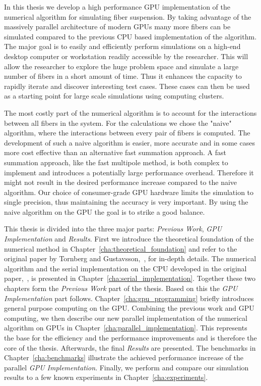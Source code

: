 In this thesis we develop a high performance GPU implementation of the numerical algorithm for simulating fiber suspension. By taking advantage of the massively parallel architecture of modern GPUs many more fibers can be simulated compared to the previous CPU based implementation of the algorithm. The major goal is to easily and efficiently perform simulations on a high-end desktop computer or workstation readily accessible by the researcher. This will allow the researcher to explore the huge problem space and simulate a large number of fibers in a short amount of time. Thus it enhances the capacity to rapidly iterate and discover interesting test cases. These cases can then be used as a starting point for large scale simulations using computing clusters.

The most costly part of the numerical algorithm is to account for the interactions between all fibers in the system. For the calculations we chose the "naive" algorithm, where the interactions between every pair of fibers is computed. The development of such a naive algorithm is easier, more accurate and in some cases more cost effective than an alternative fast summation approach. A fast summation approach, like the fast multipole method, is both complex to implement and introduces a potentially large performance overhead. Therefore it might not result in the desired performance increase compared to the naive algorithm. Our choice of consumer-grade GPU hardware limits the simulation to single precision, thus maintaining the accuracy is very important. By using the naive algorithm on the GPU the goal is to strike a good balance.

This thesis is divided into the three major parts: \emph{Previous Work}, \emph{GPU Implementation} and \emph{Results}. First we introduce the theoretical foundation of the numerical method in Chapter~\ref{cha:theoretical_foundation} and refer to the original paper by Tornberg and Gustavsson,~\cite{Tornberg2006}, for in-depth details. The numerical algorithm and the serial implementation on the CPU developed in the original paper,~\cite{Tornberg2006}, is presented in Chapter~\ref{cha:serial_implementation}. Together these two chapters form the \emph{Previous Work} part of the thesis. Based on this the \emph{GPU Implementation} part follows. Chapter~\ref{cha:gpu_programming} briefly introduces general purpose computing on the GPU. Combining the previous work and GPU computing, we then describe our new parallel implementation of the numerical algorithm on GPUs in Chapter~\ref{cha:parallel_implementation}. This represents the base for the efficiency and the performance improvements and is therefore the core of the thesis. Afterwards, the final \emph{Results} are presented. The benchmarks in Chapter~\ref{cha:benchmarks} illustrate the achieved performance increase of the parallel \emph{GPU Implementation}. Finally, we perform and compare our simulation results to a few known experiments in Chapter~\ref{cha:experiments}.
